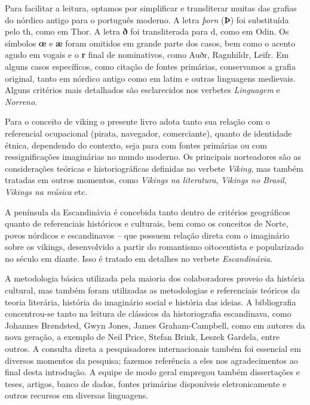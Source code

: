 Para facilitar a leitura, optamos por simplificar e transliterar muitas
das grafias do nórdico antigo para o português moderno. A letra
\emph{þorn} (\textbf{Þ}) foi substituída pelo th, como em Thor. A letra
\textbf{ð} foi transliterada para d, como em Odin. Os símbolos
\textbf{œ} e \textbf{æ} foram omitidos em grande parte dos casos, bem
como o acento agudo em vogais e o \textbf{r} final de nominativos, como
Auðr, Ragnhildr, Leifr. Em alguns casos específicos, como citação de
fontes primárias, conservamos a grafia original, tanto em nórdico antigo
como em latim e outras linguagens medievais. Alguns critérios mais
detalhados são esclarecidos nos verbetes \emph{Linguagem} e
\emph{Norreno}.

Para o conceito de viking o presente livro adota tanto sua relação com o
referencial ocupacional (pirata, navegador, comerciante), quanto de
identidade étnica, dependendo do contexto, seja para com fontes
primárias ou com ressignificações imaginárias no mundo moderno. Os
principais norteadores são as considerações teóricas e historiográficas
definidas no verbete \emph{Viking}, mas também tratadas em outros
momentos, como \emph{Vikings na literatura}, \emph{Vikings no Brasil},
\emph{Vikings na música} etc.

A península da Escandinávia é concebida tanto dentro de critérios
geográficos quanto de referenciais históricos e culturais, bem como os
conceitos de Norte, povos nórdicos e escandinavos -- que possuem relação
direta com o imaginário sobre os vikings, desenvolvido a partir do
romantismo oitocentista e popularizado no século  em diante. Isso é
tratado em detalhes no verbete \emph{Escandinávia}.

A metodologia básica utilizada pela maioria dos colaboradores proveio da
história cultural, mas também foram utilizadas as metodologias e
referenciais teóricos da teoria literária, história do imaginário social
e história das ideias. A bibliografia concentrou-se tanto na leitura de
clássicos da historiografia escandinava, como Johannes Brøndsted, Gwyn
Jones, James Graham-Campbell, como em autores da nova geração, a exemplo
de Neil Price, Stefan Brink, Leszek Gardela, entre outros. A consulta
direta a pesquisadores internacionais também foi essencial em diversos
momentos da pesquisa; fazemos referência a eles nos agradecimentos ao final desta introdução. A equipe
de modo geral empregou também dissertações e teses, artigos, banco de
dados, fontes primárias disponíveis eletronicamente e outros recursos em
diversas linguagens.

